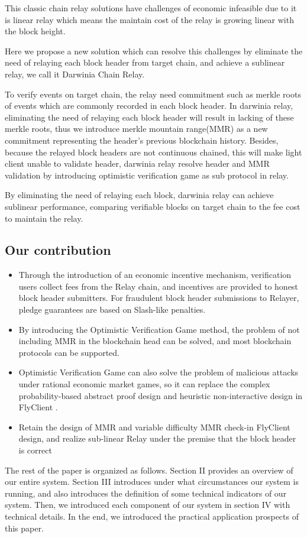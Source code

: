 This classic chain relay solutions have challenges of economic infeasible due to it is linear relay which means the maintain cost of the relay is growing linear with the block height.

Here we propose a new solution which can resolve this challenges by eliminate the need of relaying each block header from target chain, and achieve a sublinear relay, we call it Darwinia Chain Relay.

To verify events on target chain, the relay need commitment such as merkle roots of events which are commonly recorded in each block header. In darwinia relay, eliminating the need of relaying each block header will result in lacking of these merkle roots, thus we introduce merkle mountain range(MMR)\cite{MMR} as a new commitment representing the header's previous blockchain history. Besides, because the relayed block headers are not continuous chained, this will make light client unable to validate header, darwinia relay resolve header and MMR validation by introducing optimistic verification game\cite{verfG} as sub protocol in relay.

By eliminating the need of relaying each block, darwinia relay can achieve sublinear performance, comparing verifiable blocks on target chain to the fee cost to maintain the relay.

\subsection*{Our contribution}

\begin{itemize}
  \item Through the introduction of an economic incentive mechanism, verification users collect fees from the Relay chain, and incentives are provided to honest block header submitters. For fraudulent block header submissions to Relayer, pledge guarantees are based on Slash-like penalties.
  \item By introducing the Optimistic Verification Game method, the problem of not including MMR in the blockchain head can be solved, and most blockchain protocols can be supported.
  \item Optimistic Verification Game can also solve the problem of malicious attacks under rational economic market games, so it can replace the complex probability-based abstract proof design and heuristic non-interactive design in FlyClient \cite{flyclient}.
  \item Retain the design of MMR and variable difficulty MMR check-in FlyClient design, and realize sub-linear Relay under the premise that the block header is correct
\end{itemize}

The rest of the paper is organized as follows. Section II provides an overview of our entire system. Section III introduces under what circumstances our system is running, and also introduces the definition of some technical indicators of our system. Then, we introduced each component of our system  in section IV with technical details. In the end, we introduced the practical application prospects of this paper.

